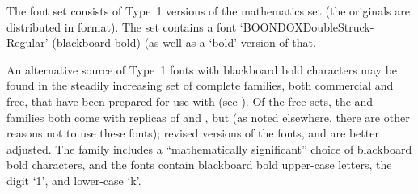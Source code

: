 The  font set consists of Type~1 versions of the
 mathematics set (the originals are distributed in
 format).  The set contains a font
`BOONDOXDoubleStruck-Regular' (blackboard bold) (as well as a `bold'
version of that.

An alternative source of Type~1 fonts with blackboard bold characters
may be found in the steadily increasing set of complete families, both
commercial and free, that have been prepared for use with \AllTeX{}
(see %
).
Of the free sets, the  and  families
both come with replicas of  and , but
(as noted elsewhere, there are other reasons not to use these fonts);
revised versions of the fonts,  and 
are better adjusted.  The  family includes a
``mathematically significant'' choice of blackboard bold characters, and the
 fonts contain blackboard bold upper-case letters,
the digit `1', and lower-case `k'.

